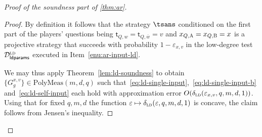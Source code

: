 \documentclass[11pt]{article}
\theoremstyle{definition}
\newcommand{\ol}[1]{\overline{#1}}
\newcommand{\ld}{\textsc{ld}}
\newcommand{\eps}{\varepsilon}
\newcommand{\decider}{\mathcal{D}}
\newcommand{\labelstyle}[1]{\ensuremath{\textsc{#1}}\xspace}
\newcommand{\tvarstyle}[1]{\mathsf{#1}}
\newcommand{\tvar}{\ensuremath{\tvarstyle{t}}}
\newcommand{\alice}{\labelstyle{A}}
\newcommand{\bob}{\labelstyle{B}}
\newcommand{\ldparams}{\mathsf{ldparams}}
\newcommand{\polymeas}[3]{\mathrm{PolyMeas}(#1,#2,#3)}
\begin{document}
\begin{proof}[Proof of the soundness part of \cref{thm:ar}]
\begin{proof}
    By definition it follows that the strategy $\tsans$ conditioned on the
    first part of the players' questions being $\tvar_{Q,w} = \tvar_{Q,\ol{w}} =
    v$ and $x_{Q,\alice}=x_{Q,\bob}=x$ is a projective strategy that succeeds
    with probability $1-\eps_{x,v}$ in the low-degree test
    $\decider^\ld_\ldparams$ executed in Item~\ref{enu:ar-input-ld}.
	
    We may thus apply Theorem~\ref{lem:ld-soundness} to obtain $\{G^{{x},v}_{g}\}
    \in \polymeas{m}{d}{q}$ such
    that~\eqref{eq:ld-single-input},~\eqref{eq:ld-single-input-b}
    and~\eqref{eq:ld-self-input} each hold with approximation error
    $O(\delta_{\ld}(\eps_{x,v},q,m,d,1))$.
    Using that for fixed $q,m,d$ the function
    $\eps\mapsto\delta_{\ld}(\eps,q,m,d,1)$ is concave, the claim follows from
    Jensen's inequality.
  \end{proof}


\end{proof}
\end{document}
